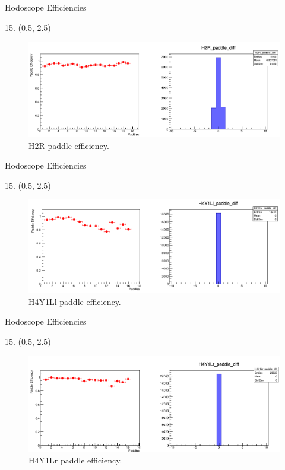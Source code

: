 \documentclass[12pt, xcolor={dvipsnames}, aspectratio = 169, sans,mathserif]{beamer}
\newenvironment{Pic}[2]
{
\begin{textblock}{#1} #2
\begin{figure}
}
{
\end{figure}
\end{textblock}
}
\begin{document}
\begin{frame}{Hodoscope Efficiencies}
\begin{Pic}{15.}{(0.5, 2.5)}
  \includegraphics[width=15.0cm]{imgs/H2R_paddle_diff.png}
  \caption{H2R paddle efficiency.}
\end{Pic}
\end{frame}

\begin{frame}{Hodoscope Efficiencies}
\begin{Pic}{15.}{(0.5, 2.5)}
  \includegraphics[width=15.0cm]{imgs/H4Y1Ll_paddle_diff.png}
  \caption{H4Y1Ll paddle efficiency.}
\end{Pic}
\end{frame}

\begin{frame}{Hodoscope Efficiencies}
\begin{Pic}{15.}{(0.5, 2.5)}
  \includegraphics[width=15.0cm]{imgs/H4Y1Lr_paddle_diff.png}
  \caption{H4Y1Lr paddle efficiency.}
\end{Pic}
\end{frame}
\end{document}
